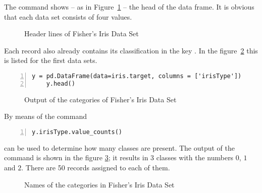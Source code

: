 The command  shows -- as in Figure~\ref{TensorFlowHead} -- the head of the data frame. It is obvious that each data set consists of four values. 

\begin{figure}[H]
    \caption{Header lines of  Fisher's Iris Data Set}\label{TensorFlowHead}
\end{figure}

Each record also already contains its classification in the key . In the figure~\ref{TensorFlowHeadType} this is listed for the first data sets.

\begin{lstlisting}[language=MyPython, numbers=left]
    y = pd.DataFrame(data=iris.target, columns = ['irisType'])
    y.head()
\end{lstlisting}

\begin{figure}[H]
    \caption{Output of the categories of  Fisher's Iris Data Set}\label{TensorFlowHeadType}
\end{figure}

By means of the command 

\begin{lstlisting}[language=MyPython, numbers=left]
    y.irisType.value_counts()
\end{lstlisting}

can be used to determine how many classes are present. The output of the command is shown in the figure \ref{TensorFlowIrisTypes}; it results in 3 classes with the numbers $0$, $1$ and $2$. There are 50 records assigned to each of them.

\begin{figure}[H]
    \caption{Names of the categories in Fisher's Iris Data Set}\label{TensorFlowIrisTypes}
\end{figure}
